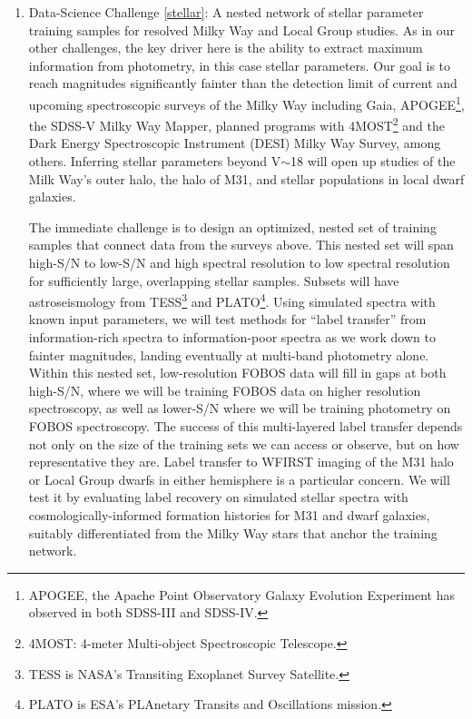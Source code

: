 \documentclass[oneside,11pt]{amsart}
\newcounter{chalno}
\newcommand{\chal}[1]{\refstepcounter{chalno}\label{#1}}
\begin{document}
\begin{enumerate}[rightmargin=0.2cm,leftmargin=0.2cm]

\chal{stellar} 
%
\item[] {\textsf {\large  Data-Science Challenge \ref{stellar}: A nested network of stellar parameter training
samples for resolved Milky Way and Local Group studies.}}  As in our other challenges, the key driver here is the
ability to extract maximum information from photometry, in this case stellar parameters.  Our goal is to reach
magnitudes significantly fainter than the detection limit of current and upcoming spectroscopic surveys of the Milky
Way including Gaia, APOGEE\footnote{APOGEE, the Apache Point Observatory Galaxy Evolution Experiment has observed in
both SDSS-III and SDSS-IV.}, the SDSS-V Milky Way Mapper, planned programs with 4MOST\footnote{4MOST: 4-meter
Multi-object Spectroscopic Telescope.} and the Dark Energy Spectroscopic Instrument (DESI) Milky Way Survey, among
others. Inferring
stellar parameters beyond V$\sim$18 will open up studies of the Milk Way's outer halo, the halo of M31, and stellar
populations in local dwarf galaxies.

The immediate challenge is to design an optimized, nested set of training samples that connect data from the surveys
above.  This nested set will span high-S/N to low-S/N and high spectral resolution to low spectral resolution for
sufficiently large, overlapping stellar samples.  Subsets will have astroseismology from TESS\footnote{TESS is NASA's
Transiting Exoplanet Survey Satellite.} and PLATO\footnote{PLATO is ESA's PLAnetary Transits and Oscillations
mission.}.  Using simulated spectra with known input parameters, we will test methods for ``label transfer'' from
information-rich spectra to information-poor spectra as we work down to fainter magnitudes, landing eventually at
multi-band photometry alone. Within this nested set, low-resolution FOBOS data will fill in gaps at both high-S/N,
where we will be training FOBOS data on higher resolution spectroscopy, as well as lower-S/N where we will be training
photometry on FOBOS spectroscopy.  The success of this multi-layered label transfer depends not only on the size of the
training sets we can access or observe, but on how representative they are.  Label transfer to WFIRST imaging of the
M31 halo or Local Group dwarfs in either hemisphere is a particular concern.  We will test it by evaluating label
recovery on simulated stellar spectra with cosmologically-informed formation histories for M31 and dwarf galaxies,
suitably differentiated from the Milky Way stars that anchor the training network.




\end{enumerate}
\end{document}
